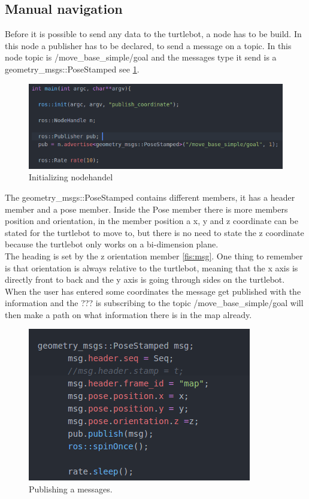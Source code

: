\subsection{Manual navigation}
Before it is possible to send any data to the turtlebot, a node has to be build. In this node a publisher has to be declared, to send a message on a topic. In this node topic is /move\_base\_simple/goal and the messages type it send is a geometry\_msgs::PoseStamped see \ref{fig:nodehandle}.
\begin{figure}[h]
    \centering
    \includegraphics[width=.7\textwidth]{figures/initByC.png}
    \caption{Initializing nodehandel} 
    \label{fig:nodehandle} 
\end{figure}

The geometry\_msgs::PoseStamped contains different members, it has a header member and a pose member. Inside the Pose member there is more members position and orientation, in the member position a x, y and z coordinate can be stated for the turtlebot to move to, but there is no need to state the z coordinate because the turtlebot only works on a bi-dimension plane.\\ 
The heading is set by the z orientation member \ref{fis:msg}. One thing to remember is that orientation is always relative to the turtlebot, meaning that the x axis is directly front to back and the y axis is going through sides on the turtlebot. When the user has entered some coordinates the message get published with the information and the ??? is subscribing to the topic /move\_base\_simple/goal will then make a path on what information there is in the map already.
\begin{figure}
    \centering
    \includegraphics[width=.5\textwidth]{figures/msgbyc.png}
    \caption{Publishing a messages.} 
    \label{fig:msg} 
\end{figure}